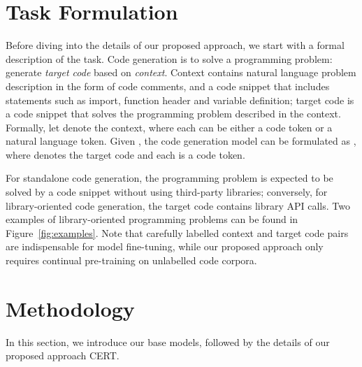 \documentclass{article}
\newcommand{\cert}{\textsc{CERT}\xspace}
\begin{document}
\section{Task Formulation}\label{sec:formulation}
Before diving into the details of our proposed approach, we start with a formal description of the task.
Code generation is to solve a programming problem: generate \emph{target code} based on \emph{context}. Context contains natural language problem description in the form of code comments, and a code snippet that includes statements such as import, function header and variable definition; target code is a code snippet that solves the programming problem described in the context. Formally, let  denote the context, where each  can be either a code token or a natural language token. Given , the code generation model can be formulated as , where  denotes the target code and each  is a code token.

For standalone code generation, the programming problem is expected to be solved by a code snippet without using third-party libraries; conversely, for library-oriented code generation, the target code  contains library API calls. Two examples of library-oriented programming problems can be found in Figure~\ref{fig:examples}. Note that carefully labelled context and target code pairs are indispensable for model fine-tuning, while our proposed approach only requires continual pre-training on unlabelled code corpora.

\section{Methodology} \label{methodology}
In this section, we introduce our base models, followed by the details of our proposed approach \cert.
\end{document}
